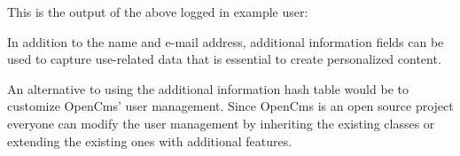 This is the output of the above logged in example user:

In addition to the name and e-mail address, additional information
fields can be used to capture use-related data that is essential to
create personalized content.

An alternative to using the additional information hash table would be
to customize OpenCms' user management. Since OpenCms is an open source
project everyone can modify the user management by inheriting the
existing classes or extending the existing ones with additional features.

